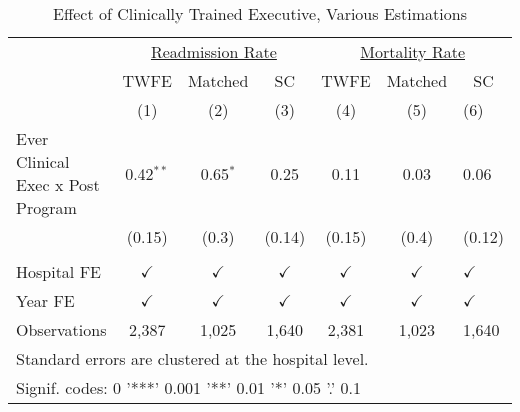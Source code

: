 \begin{table}[ht!]

\caption{\label{tab:main_twfe_match}Effect of Clinically Trained Executive, Various Estimations}
\centering
\begin{tabular}[t]{lcccccl}
\toprule
\multicolumn{1}{c}{\underline{ }} & \multicolumn{3}{c}{\underline{Readmission Rate}} & \multicolumn{3}{c}{\underline{Mortality Rate}} \\
\cmidrule(l{3pt}r{3pt}){2-4} \cmidrule(l{3pt}r{3pt}){5-7}
\multicolumn{1}{c}{ } & \multicolumn{1}{c}{TWFE} & \multicolumn{1}{c}{Matched} & \multicolumn{1}{c}{SC} & \multicolumn{1}{c}{TWFE} & \multicolumn{1}{c}{Matched} & \multicolumn{1}{c}{SC} \\
\cmidrule(l{3pt}r{3pt}){2-2} \cmidrule(l{3pt}r{3pt}){3-3} \cmidrule(l{3pt}r{3pt}){4-4} \cmidrule(l{3pt}r{3pt}){5-5} \cmidrule(l{3pt}r{3pt}){6-6} \cmidrule(l{3pt}r{3pt}){7-7}
 & (1) & (2) & (3) & (4) & (5) & (6)\\
\midrule
Ever Clinical Exec x Post Program & 0.42$^{**}$ & 0.65$^{*}$ & 0.25 & 0.11 & 0.03 & 0.06\\
 & (0.15) & (0.3) & (0.14) & (0.15) & (0.4) & (0.12)\\
 &  &  &  &  &  & \\
Hospital FE & $\checkmark$ & $\checkmark$ & $\checkmark$ & $\checkmark$ & $\checkmark$ & $\checkmark$\\
Year FE & $\checkmark$ & $\checkmark$ & $\checkmark$ & $\checkmark$ & $\checkmark$ & $\checkmark$\\
\addlinespace
Observations & 2,387 & 1,025 & 1,640 & 2,381 & 1,023 & 1,640\\
\bottomrule
\multicolumn{7}{l}{\textsuperscript{} Standard errors are clustered at the hospital level.}\\
\multicolumn{7}{l}{\textsuperscript{} Signif. codes: 0 '***' 0.001 '**' 0.01 '*' 0.05 '.' 0.1}\\
\end{tabular}
\end{table}
